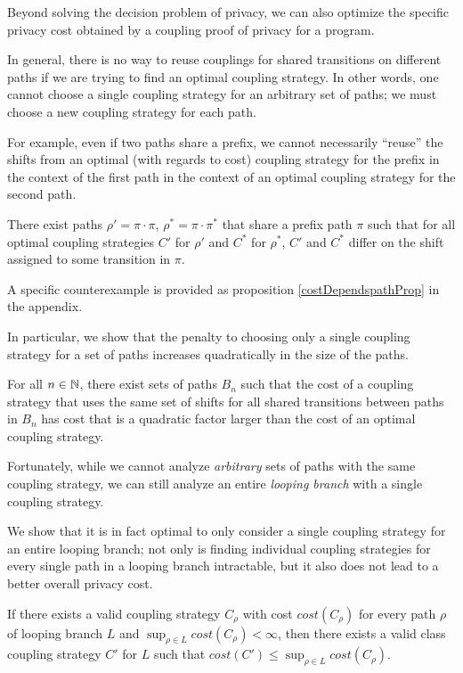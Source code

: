 
Beyond solving the decision problem of privacy, we can also optimize the specific privacy cost obtained by a coupling proof of privacy for a program. 

In general, there is no way to reuse couplings for shared transitions on different paths if we are trying to find an optimal coupling strategy. In other words, one cannot choose a single coupling strategy for an arbitrary set of paths; we must choose a new coupling strategy for each path.

For example, even if two paths share a prefix, we cannot necessarily ``reuse'' the shifts from an optimal (with regards to cost) coupling strategy for the prefix in the context of the first path in the context of an optimal coupling strategy for the second path. 

\begin{prop}\label{noSharingStrategiesProp}
  There exist paths $\rho'=\pi\cdot \pi$, $\rho^*=\pi\cdot\pi^*$ that share a prefix path $\pi$ such that for all optimal coupling strategies $C'$ for $\rho'$ and $C^*$ for $\rho^*$, $C'$ and $C^*$ differ on the shift assigned to some transition in $\pi$. 
\end{prop}

A specific counterexample is provided as proposition \ref{costDependspathProp} in the appendix. 

In particular, we show that the penalty to choosing only a single coupling strategy for a set of paths increases quadratically in the size of the paths.

\begin{prop}
  For all $n\in \mathbb{N}$, there exist sets of paths $B_n$ such that the cost of a coupling strategy that uses the same set of shifts for all shared transitions between paths in $B_n$ has cost that is a quadratic factor larger than the cost of an optimal coupling strategy. 
\end{prop}

Fortunately, while we cannot analyze \textit{arbitrary} sets of paths with the same coupling strategy, we can still analyze an entire \textit{looping branch} with a single coupling strategy.

We show that it is in fact optimal to only consider a single coupling strategy for an entire looping branch; not only is finding individual coupling strategies for every single path in a looping branch intractable, but it also does not lead to a better overall privacy cost. 

\begin{prop}\label{ClassCouplingStrategiesAreEnoughProp}
    If there exists a valid coupling strategy $C_\rho$ with cost $cost(C_\rho)$ for every path $\rho$ of looping branch $L$ and $\sup_{\rho\in L}cost(C_\rho)< \infty$, then there exists a valid class coupling strategy $C'$ for $L$ such that $cost(C') \leq \sup_{\rho\in L}cost(C_\rho)$. 
\end{prop}

